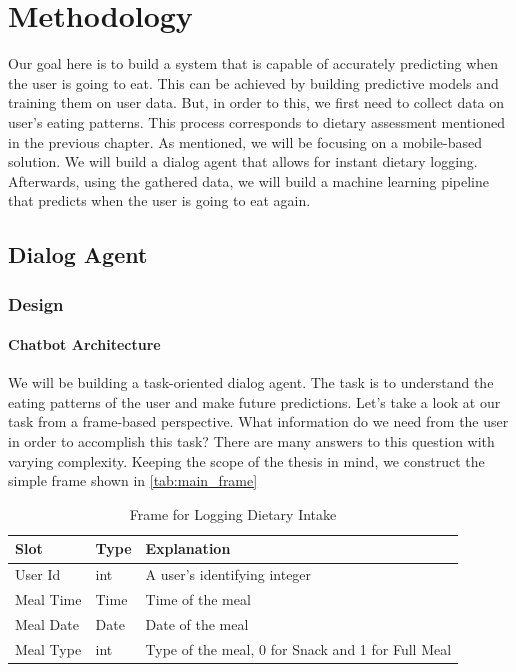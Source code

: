 
\chapter{Methodology}\label{chapter:methodology}
Our goal here is to build a system that is capable of accurately predicting when the user is going to eat.
This can be achieved by building predictive models and training them on user data.
But, in order to this, we first need to collect data on user's eating patterns.
This process corresponds to dietary assessment mentioned in the previous chapter.
As mentioned, we will be focusing on a mobile-based solution.
We will build a dialog agent that allows for instant dietary logging.
Afterwards, using the gathered data, we will build a machine learning pipeline that predicts when the user is going to eat again.

\section{Dialog Agent}
\subsection{Design}
\subsubsection{Chatbot Architecture}
We will be building a task-oriented dialog agent.
The task is to understand the eating patterns of the user and make future predictions.
Let's take a look at our task from a frame-based perspective.
What information do we need from the user in order to accomplish this task?
There are many answers to this question with varying complexity.
Keeping the scope of the thesis in mind, we construct the simple frame shown in \autoref{tab:main_frame}

\begin{table}[htbp]
  \caption[Frame for Logging Dietary Intake]{Frame for Logging Dietary Intake}\label{tab:main_frame}
  \centering
  \begin{tabular}{l|l|l}
    Slot&Type&Explanation\\ \toprule
    User Id&int&A user's identifying integer \\ \hline
    Meal Time&Time&Time of the meal\\ \hline
    Meal Date&Date&Date of the meal\\ \hline
    Meal Type&int&Type of the meal, 0 for Snack and 1 for Full Meal \\ \hline
  \end{tabular}
\end{table}

